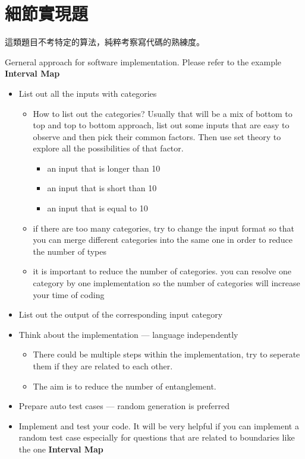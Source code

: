 \chapter{細節實現題}
這類題目不考特定的算法，純粹考察寫代碼的熟練度。
\newline

Gerneral approach for software implementation. Please refer to the example \textbf{Interval Map}
\begin{itemize}
  \item List out all the inputs with categories
  \begin{itemize}
    \item How to list out the categories? Usually that will be a mix of bottom to top and top to bottom approach, list out some inputs that are easy to observe and then pick their common factors. Then use set theory to explore all the possibilities of that factor.
    \begin{itemize}
      \item an input that is longer than 10
      \item an input that is short than 10
      \item an input that is equal to 10
    \end{itemize}
    \item if there are too many categories, try to change the input format so that you can merge different categories into the same one in order to reduce the number of types
    \item it is important to reduce the number of categories. you can resolve one category by one implementation so the number of categories will increase your time of coding
  \end{itemize}
  \item List out the output of the corresponding input category
  \item Think about the implementation --- language independently
  \begin{itemize}
    \item There could be multiple steps within the implementation, try to seperate them if they are related to each other.
    \item The aim is to reduce the number of entanglement.
  \end{itemize}
  \item Prepare auto test cases --- random generation is preferred
  \item Implement and test your code. It will be very helpful if you can implement a random test case especially for questions that are related to boundaries like the one \textbf{Interval Map}
\end{itemize}


